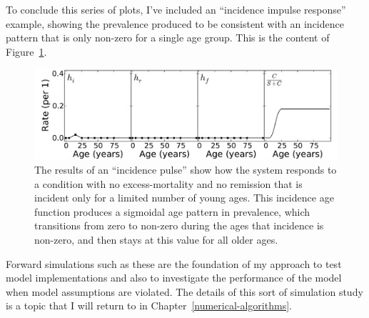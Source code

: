 To conclude this series of plots, I've included an ``incidence impulse
response'' example, showing the prevalence produced to be consistent
with an incidence pattern that is only non-zero for a single age
group. This is the content of
Figure~\ref{forward-sim-incidence-pluse}.

\begin{figure}[h]
\begin{center}

\includegraphics[width=\textwidth]{forward-sim-incidence_pulse.pdf}

\caption{The results of an ``incidence pulse'' show how the system
  responds to a condition with no excess-mortality and no remission
  that is incident only for a limited number of young ages.  This
  incidence age function produces a sigmoidal age pattern in
  prevalence, which transitions from zero to non-zero during the ages
  that incidence is non-zero, and then stays at this value for all
  older ages.}
\label{forward-sim-incidence-pluse}
\end{center}
\end{figure}



Forward simulations such as these are the foundation of my approach to
test model implementations and also to investigate the performance
of the model when model assumptions are violated. The details of this
sort of simulation study is a topic that I will return to in
Chapter~\ref{numerical-algorithms}.

